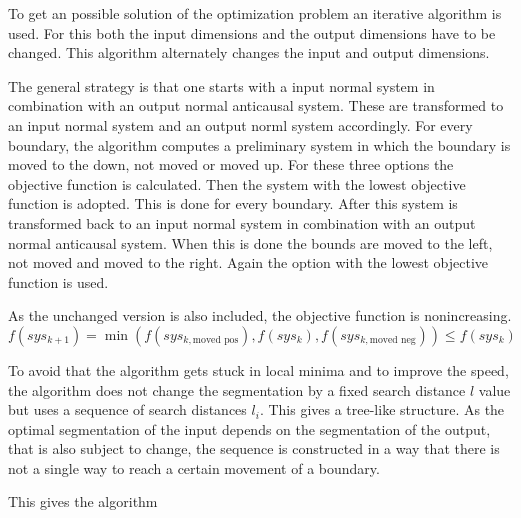 \documentclass[doctype=mastersthesis,BCOR=15mm,biblatex]{ldvbook}%
\begin{document}
To get an possible solution of the optimization problem an iterative algorithm is used.
For this both the input dimensions and the output dimensions have to be changed.
This algorithm alternately changes the input and output dimensions.

The general strategy is that one starts with a input normal system in combination with an output normal anticausal system.
These are transformed to an input normal system and an output norml system accordingly.
For every boundary, the algorithm computes a preliminary system in which the boundary is moved to the down, not moved or moved up.
For these three options the objective function is calculated. 
Then the system with the lowest objective function is adopted.
This is done for every boundary.
After this system is transformed back to an input normal system in combination with an output normal anticausal system.
When this is done the bounds are moved to the left, not moved and moved to the right.
Again the option with the lowest objective function is used.

As the unchanged version is also included, the objective function is nonincreasing.
\begin{equation}
	f(sys_{k+1}) = \min(f(sys_{k,\text{moved pos}}),f(sys_{k}),f(sys_{k,\text{moved neg}})) \leq f(sys_{k})
\end{equation}

To avoid that the algorithm gets stuck in local minima and to improve the speed, the algorithm does not change the segmentation by a fixed search distance $l$ value but uses a sequence of search distances $l_i$.
This gives a tree-like structure.
As the optimal segmentation of the input depends on the segmentation of the output, that is also subject to change, the sequence is constructed in a way that there is not a single way to reach a certain movement of a boundary.

This gives the algorithm

\end{document}
